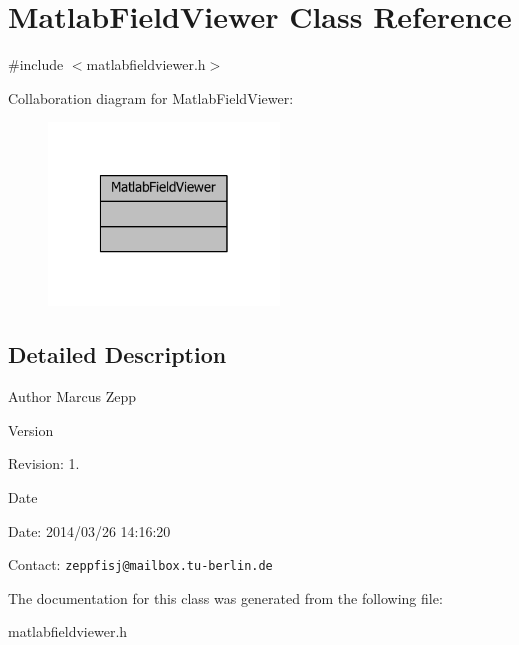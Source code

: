\section{Matlab\-Field\-Viewer Class Reference}
\label{classMatlabFieldViewer}


{\ttfamily \#include $<$matlabfieldviewer.\-h$>$}



Collaboration diagram for Matlab\-Field\-Viewer\-:
\nopagebreak
\begin{figure}[H]
\begin{center}
\leavevmode
\includegraphics[width=174pt]{d1/d43/classMatlabFieldViewer__coll__graph}
\end{center}
\end{figure}


\subsection{Detailed Description}
\begin{DoxyAuthor}{Author}
Marcus Zepp
\end{DoxyAuthor}
\begin{DoxyVersion}{Version}

\end{DoxyVersion}
\begin{DoxyParagraph}{Revision\-:}
1. 
\end{DoxyParagraph}


\begin{DoxyDate}{Date}

\end{DoxyDate}
\begin{DoxyParagraph}{Date\-:}
2014/03/26 14\-:16\-:20 
\end{DoxyParagraph}


Contact\-: {\tt zeppfisj@mailbox.\-tu-\/berlin.\-de} 

The documentation for this class was generated from the following file\-:\begin{DoxyCompactItemize}
\item 
matlabfieldviewer.\-h\end{DoxyCompactItemize}
